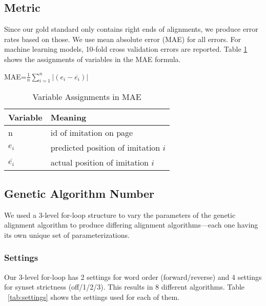 \subsection{Metric}
Since our gold standard only contains right ends of alignments, we produce error rates based on those. We use mean absolute error (MAE) for all errors. For machine learning models, 10-fold cross validation errors are reported. Table \ref{tab:variable_assignments} shows the assignments of variables in the MAE formula.

\begin{center}
	MAE=$\frac{1}{n}\sum_{i=1}^{n}{|(e_i-\overline{e_i})|}$
\end{center}

\begin{table}[center]
	\centering
	\begin{tabular} {| l | l |}
		\hline	\textbf{Variable} 	&	\textbf{Meaning} 			\\
		\hline	n			&	id of imitation on page			\\
		\hline	$e_i$			&	predicted position of imitation $i$	\\
		\hline	$\overline{e_i}$	&	actual position of imitation $i$	\\ \hline
	\end{tabular}
	\caption{Variable Assignments in MAE}
	\label{tab:variable_assignments}
\end{table}


\subsection{Genetic Algorithm Number}%
We used a 3-level for-loop structure to vary the parameters of the genetic alignment algorithm to produce differing alignment algorithms---each one having its own unique set of parameterizations. 

\subsubsection{Settings}
Our 3-level for-loop has 2 settings for word order (forward/reverse) and 4 settings for synset strictness (off/1/2/3). This results in 8 different algorithms. Table ~\ref{tab:settings} shows the settings used for each of them.

